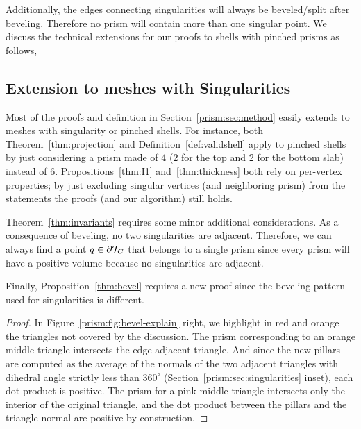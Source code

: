 Additionally, the edges connecting singularities will always be beveled/split after beveling. Therefore no prism will contain more than one singular point.
We discuss the technical extensions for our proofs to shells with pinched prisms as follows,

\subsection{Extension to meshes with Singularities}\label{sec:extend-singularity}
Most of the proofs and definition in Section~\ref{prism:sec:method} easily extends to meshes with singularity or pinched shells. For instance,
{both} Theorem~\ref{thm:projection} and Definition~\ref{def:validshell} apply to pinched shells by just considering a prism made of 4 (2 for the top and 2 for the bottom slab) instead of 6. Propositions~\ref{thm:I1} and~\ref{thm:thickness} both rely on per-vertex properties; by just excluding singular vertices (and neighboring prism) from the statements the proofs (and our algorithm) still holds.


Theorem~\ref{thm:invariants} requires some minor additional considerations. As a consequence of beveling, no two singularities are adjacent. Therefore, we can always find a point $q \in \partial \mathcal{T}_C$ that belongs to a single prism since every prism will have a positive volume 
because no singularities are adjacent.


Finally, Proposition~\ref{thm:bevel} requires a new proof since the beveling pattern used for singularities is different.
\begin{proof}
In  Figure~\ref{prism:fig:bevel-explain} right, we highlight in red and orange the triangles not covered by the discussion. 
The prism corresponding to an orange middle triangle intersects the edge-adjacent triangle. And since the new pillars are computed as the average of the normals of the two adjacent triangles with dihedral angle strictly less than $360^\circ$ 
 (Section~\ref{prism:sec:singularities} inset), each dot product is positive. 
The prism {for} a pink middle triangle intersects only the interior of the original triangle, and the dot product between the pillars and the triangle normal are positive by construction. 
\end{proof}



